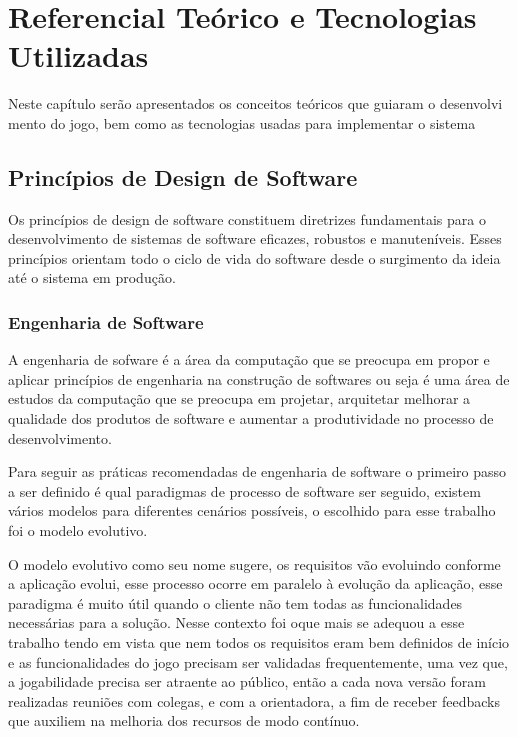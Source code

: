 \chapter{Referencial Teórico e Tecnologias Utilizadas}
\label{sec-referencial}
Neste capítulo serão apresentados os conceitos teóricos que guiaram o desenvolvi
mento do jogo, bem como as tecnologias usadas para implementar o sistema

\section{Princípios de Design de Software}
Os princípios de design de software constituem diretrizes fundamentais para o desenvolvimento de sistemas de software eficazes, robustos e manuteníveis. Esses princípios orientam todo o ciclo de vida do software desde o surgimento da ideia até o sistema em produção. 
\subsection{Engenharia de Software}
A engenharia de sofware é a área da computação que se preocupa em propor e aplicar princípios de engenharia na construção de softwares\cite{EngSoftMod} ou seja é uma área de estudos da computação que se preocupa em projetar, arquitetar melhorar a qualidade dos produtos de software e aumentar a produtividade no processo de desenvolvimento. 

Para seguir as práticas recomendadas de engenharia de software o primeiro passo a ser definido é qual paradigmas de processo de software ser seguido, existem vários modelos para diferentes cenários possíveis, o escolhido para esse trabalho foi o modelo evolutivo.

O modelo evolutivo como seu nome sugere, os requisitos vão evoluindo conforme a aplicação evolui, esse processo ocorre em paralelo à evolução da aplicação, esse paradigma é muito útil quando o cliente não tem todas as funcionalidades necessárias para a solução. Nesse contexto foi oque mais se adequou a esse trabalho tendo em vista que nem todos os requisitos eram bem definidos de início e as funcionalidades do jogo precisam ser validadas frequentemente, uma vez que, a jogabilidade precisa ser atraente ao público, então a cada nova versão foram realizadas reuniões com colegas, e com a orientadora, a fim de receber feedbacks que auxiliem na melhoria dos recursos de modo contínuo.

